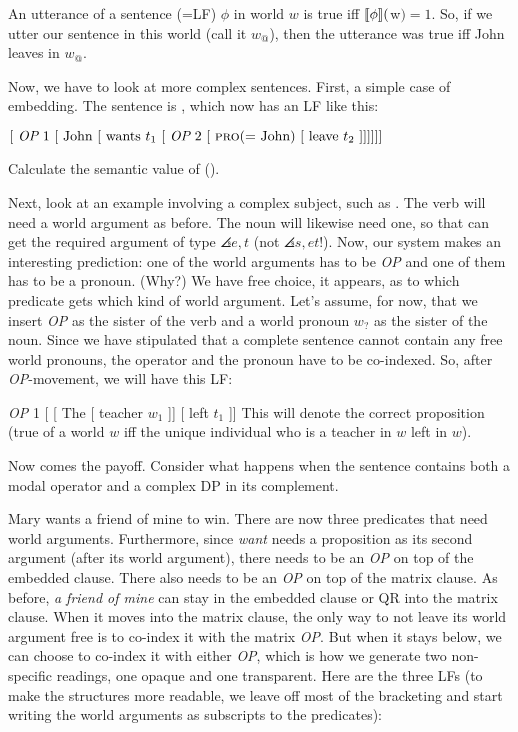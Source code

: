 \ex An utterance of a sentence (=LF) $\phi$ in world $w$ is true iff
$\llbracket \phi \rrbracket($w$) = 1$. \xe
%
So, if we utter our sentence in this world (call it $w_@$), then the utterance
was true iff John leaves in $w_@$.

Now, we have to look at more complex sentences. First, a simple case of
embedding. The sentence is , which now has an LF
like this:

\ex $[\ \emph{OP}\ 1\ [ \mbox{ John } [ \mbox{ wants } t_{1}\ [\ \emph{OP}\ 2\ [
\mbox{ \textsc{pro}(= John) } [ \mbox{ leave } t_{2}\ ]]]]]]$ \xe
 
\begin{exercise}
	Calculate the semantic value of (\lastx). \eex
\end{exercise}

Next, look at an example involving a complex subject, such as . The verb will need a world argument as before. The noun
 will likewise need one, so that  can get
the required argument of type $\angles{e,t}$ (not $\angles{s,et}$!). Now, our
system makes an interesting prediction: one of the world arguments has to be
\emph{OP} and one of them has to be a pronoun. (Why?) We have free choice, it
appears, as to which predicate gets which kind of world argument. Let's assume,
for now, that we insert \emph{OP} as the sister of the verb and a world pronoun
$w_?$ as the sister of the noun. Since we have stipulated that a complete
sentence cannot contain any free world pronouns, the operator and the pronoun
have to be co-indexed. So, after \emph{OP}-movement, we will have this LF:

\ex \emph{OP} 1 [ [ The [ teacher $w_1$ ]] [ left $t_1$ ]] \xe
%
This will denote the correct proposition (true of a world $w$ iff the unique
individual who is a teacher in $w$ left in $w$).

Now comes the payoff. Consider what happens when the sentence contains both a
modal operator and a complex DP in its complement.

\ex \label{fom} Mary wants a friend of mine to win. \xe
%
There are now three predicates that need world arguments. Furthermore, since
\emph{want} needs a proposition as its second argument (after its world
argument), there needs to be an \emph{OP} on top of the embedded clause. There
also needs to be an \emph{OP} on top of the matrix clause. As before, \emph{a
  friend of mine} can stay in the embedded clause or QR into the matrix clause.
When it moves into the matrix clause, the only way to not leave its world
argument free is to co-index it with the matrix \emph{OP}. But when it stays
below, we can choose to co-index it with either \emph{OP}, which is how we
generate two non-specific readings, one opaque and one transparent. Here are the
three LFs (to make the structures more readable, we leave off most of the
bracketing and start writing the world arguments as subscripts to the
predicates):

